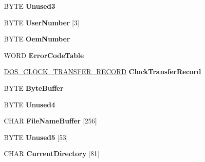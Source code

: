 \begin{DoxyCompactItemize}
\item 
\mbox{\label{struct___d_o_s___s_d_a_a927c2f3f111be58039453f951dee2e05}} 
B\+Y\+TE {\bfseries Unused3}
\item 
\mbox{\label{struct___d_o_s___s_d_a_a6cf437e8d0d1f46e68fd8395ff3984c4}} 
B\+Y\+TE {\bfseries User\+Number} \mbox{[}3\mbox{]}
\item 
\mbox{\label{struct___d_o_s___s_d_a_a0ea840dcbe3ff4e195d1d120ee150bc8}} 
B\+Y\+TE {\bfseries Oem\+Number}
\item 
\mbox{\label{struct___d_o_s___s_d_a_a3018df2f401d8486620fe0e60cfbe568}} 
W\+O\+RD {\bfseries Error\+Code\+Table}
\item 
\mbox{\label{struct___d_o_s___s_d_a_a124b1465491c68bfcf3fe12a0b636031}} 
\hyperlink{struct___d_o_s___c_l_o_c_k___t_r_a_n_s_f_e_r___r_e_c_o_r_d}{D\+O\+S\+\_\+\+C\+L\+O\+C\+K\+\_\+\+T\+R\+A\+N\+S\+F\+E\+R\+\_\+\+R\+E\+C\+O\+RD} {\bfseries Clock\+Transfer\+Record}
\item 
\mbox{\label{struct___d_o_s___s_d_a_a5b685ecb36a7e528707620df870a3f0e}} 
B\+Y\+TE {\bfseries Byte\+Buffer}
\item 
\mbox{\label{struct___d_o_s___s_d_a_aec2fc5c7c1417110f59e5c42357084a8}} 
B\+Y\+TE {\bfseries Unused4}
\item 
\mbox{\label{struct___d_o_s___s_d_a_a0333281c2e602edc52e6a0bd62da791e}} 
C\+H\+AR {\bfseries File\+Name\+Buffer} \mbox{[}256\mbox{]}
\item 
\mbox{\label{struct___d_o_s___s_d_a_a4599c57e6814ab86ea4cac5796f1203a}} 
B\+Y\+TE {\bfseries Unused5} \mbox{[}53\mbox{]}
\item 
\mbox{\label{struct___d_o_s___s_d_a_a62a2e3f7d37b2519d5f184bc9600f04e}} 
C\+H\+AR {\bfseries Current\+Directory} \mbox{[}81\mbox{]}
\item 
\mbox{\label{struct___d_o_s___s_d_a_ace29a607e6c018f1df07f16a930670c6}} 

\end{DoxyCompactItemize}
